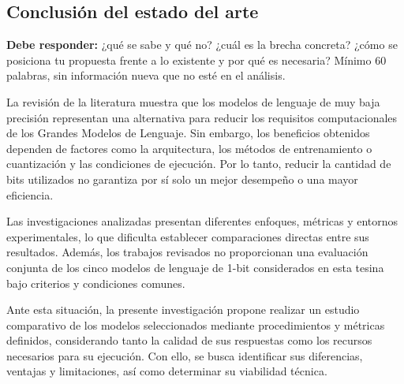 \subsection{Conclusión del estado del arte} \label{sec:conclusion_estado_arte} %

\begin{guia}
\textbf{Debe responder:} ¿qué se sabe y qué no? ¿cuál es la brecha concreta? ¿cómo se posiciona tu propuesta frente a lo
existente y por qué es necesaria? Mínimo 60 palabras, sin información nueva que no esté en el análisis.
\end{guia}

La revisión de la literatura muestra que los modelos de lenguaje de muy baja precisión representan una alternativa para reducir los requisitos computacionales de los Grandes Modelos de Lenguaje. Sin embargo, los beneficios obtenidos dependen de factores como la arquitectura, los métodos de entrenamiento o cuantización y las condiciones de ejecución. Por lo tanto, reducir la cantidad de bits utilizados no garantiza por sí solo un mejor desempeño o una mayor eficiencia.

Las investigaciones analizadas presentan diferentes enfoques, métricas y entornos experimentales, lo que dificulta establecer comparaciones directas entre sus resultados. Además, los trabajos revisados no proporcionan una evaluación conjunta de los cinco modelos de lenguaje de 1-bit considerados en esta tesina bajo criterios y condiciones comunes.

Ante esta situación, la presente investigación propone realizar un estudio comparativo de los modelos seleccionados mediante procedimientos y métricas definidos, considerando tanto la calidad de sus respuestas como los recursos necesarios para su ejecución. Con ello, se busca identificar sus diferencias, ventajas y limitaciones, así como determinar su viabilidad técnica.
